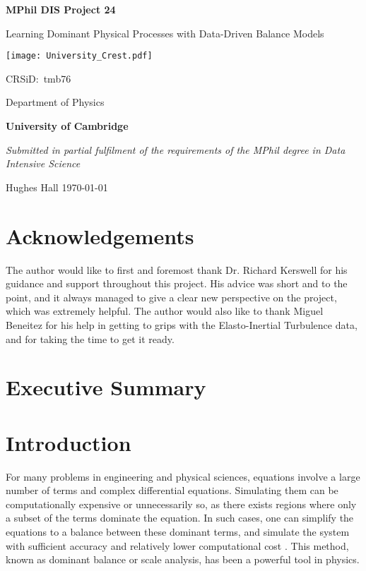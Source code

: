 \documentclass[12pt]{report} %
\begin{document}
\begin{titlepage}
  \centering
  {\LARGE\bfseries MPhil DIS Project 24\par}
  {\LARGE Learning Dominant Physical Processes with Data-Driven Balance Models\par}
  \vspace{1cm}
  {\texttt{[image: University\_Crest.pdf]}\par}
  {\Large CRSiD:\ tmb76\par}
  \vspace{1cm}
  {\Large Department of Physics\par}
  {\Large\bfseries University of Cambridge\par}
  \vfill
  {\itshape Submitted in partial fulfilment of the requirements of the MPhil degree in Data Intensive Science}
  \vfill
  {\large Hughes Hall  \hspace{6cm} \today\par}
\end{titlepage}

\chapter*{Acknowledgements}

The author would like to first and foremost thank Dr. Richard Kerswell for his guidance and support throughout this project. His advice was short and to the point, and it always managed to give a clear new perspective on the project, which was extremely helpful. The author would also like to thank Miguel Beneitez for his help in getting to grips with the Elasto-Inertial Turbulence data, and for taking the time to get it ready.

\tableofcontents

\chapter{Executive Summary}


\chapter{Introduction}


For many problems in engineering and physical sciences, equations involve a large number of terms and complex differential equations. Simulating them can be computationally expensive or unnecessarily so, as there exists regions where only a subset of the terms dominate the equation. In such cases, one can simplify the equations to a balance between these dominant terms, and simulate the system with sufficient accuracy and relatively lower computational cost \cite{charney1990scale}. This method, known as dominant balance or scale analysis, has been a powerful tool in physics.
\end{document}
